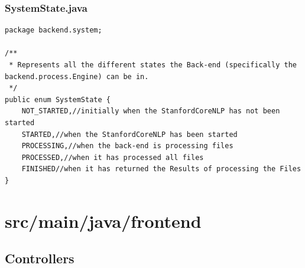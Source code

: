 \subsubsection{SystemState.java}
\begin{lstlisting}
package backend.system;

/**
 * Represents all the different states the Back-end (specifically the backend.process.Engine) can be in.
 */
public enum SystemState {
    NOT_STARTED,//initially when the StanfordCoreNLP has not been started
    STARTED,//when the StanfordCoreNLP has been started
    PROCESSING,//when the back-end is processing files
    PROCESSED,//when it has processed all files
    FINISHED//when it has returned the Results of processing the Files
}
\end{lstlisting}
\section{src/main/java/frontend}
\subsection{Controllers}
